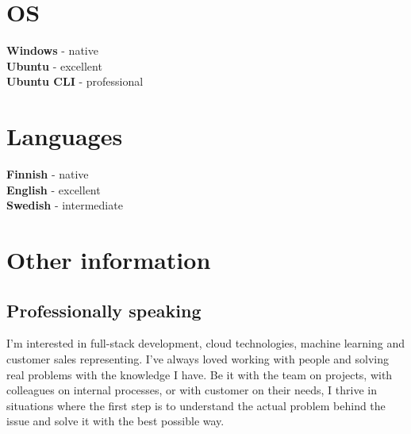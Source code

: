 \documentclass[letterpaper]{twentysecondcv}
\begin{document}



\begin{minipage}[t]{0.5\textwidth}
  \vspace{-\baselineskip} %

  \section{OS}

  \textbf{Windows} - native \\
  \textbf{Ubuntu} - excellent \\
  \textbf{Ubuntu CLI} - professional


\end{minipage}
\hfill
\begin{minipage}[t]{0.5\textwidth}
  \vspace{-\baselineskip} %

  \section{Languages}

  \textbf{Finnish} - native \\
  \textbf{English} - excellent \\
  \textbf{Swedish} - intermediate \\

\end{minipage}



\section{Other information}


\subsection{Professionally speaking}

I'm interested in full-stack development, cloud technologies, machine learning and customer sales representing.
I've always loved working with people and solving real problems with the knowledge I have.
Be it with the team on projects, with colleagues on internal processes, or with customer on their needs,
I thrive in situations where the first step is to understand the actual problem behind the issue
and solve it with the best possible way.
\end{document}
